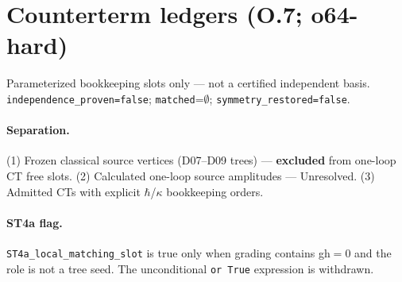 \section{Counterterm ledgers (O.7; o64-hard)}
\label{sec:O-ct}

Parameterized bookkeeping slots only --- not a certified independent basis.
\texttt{independence\_proven=false}; \texttt{matched}=$\emptyset$; \texttt{symmetry\_restored=false}.

\paragraph{Separation.}
(1) Frozen classical source vertices (D07--D09 trees) --- \textbf{excluded} from one-loop CT free slots.
(2) Calculated one-loop source amplitudes --- Unresolved.
(3) Admitted CTs with explicit $\hbar$/$\kappa$ bookkeeping orders.

\paragraph{ST4a flag.}
\texttt{ST4a\_local\_matching\_slot} is true only when grading contains gh$=0$ and the role is not a
tree seed. The unconditional \texttt{or True} expression is withdrawn.
